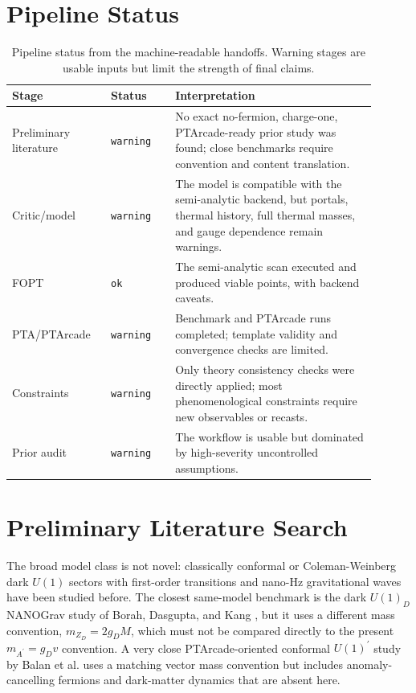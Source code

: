 \documentclass[11pt]{article}
\newcommand{\ap}{A^\prime}
\newcommand{\gD}{g_D}
\newcommand{\status}[1]{\texttt{#1}}
\begin{document}
\section{Pipeline Status}

\begin{table}[htbp]
\centering
\small
\begin{tabular}{p{0.24\linewidth}p{0.16\linewidth}p{0.50\linewidth}}
\toprule
Stage & Status & Interpretation \\
\midrule
Preliminary literature & \status{warning} & No exact no-fermion, charge-one, PTArcade-ready prior study was found; close benchmarks require convention and content translation. \\
Critic/model & \status{warning} & The model is compatible with the semi-analytic backend, but portals, thermal history, full thermal masses, and gauge dependence remain warnings. \\
FOPT & \status{ok} & The semi-analytic scan executed and produced viable points, with backend caveats. \\
PTA/PTArcade & \status{warning} & Benchmark and PTArcade runs completed; template validity and convergence checks are limited. \\
Constraints & \status{warning} & Only theory consistency checks were directly applied; most phenomenological constraints require new observables or recasts. \\
Prior audit & \status{warning} & The workflow is usable but dominated by high-severity uncontrolled assumptions. \\
\bottomrule
\end{tabular}
\caption{Pipeline status from the machine-readable handoffs. Warning stages are usable inputs but limit the strength of final claims.}
\label{tab:pipeline}
\end{table}

\section{Preliminary Literature Search}

The broad model class is not novel: classically conformal or Coleman-Weinberg dark \(U(1)\) sectors with first-order transitions and nano-Hz gravitational waves have been studied before. The closest same-model benchmark is the dark \(U(1)_D\) NANOGrav study of Borah, Dasgupta, and Kang \cite{Borah:2021}, but it uses a different mass convention, \(m_{Z_D}=2g_D M\), which must not be compared directly to the present \(m_{\ap}=\gD v\) convention. A very close PTArcade-oriented conformal \(U(1)^\prime\) study by Balan et al. \cite{Balan:2025} uses a matching vector mass convention but includes anomaly-cancelling fermions and dark-matter dynamics that are absent here.
\end{document}
